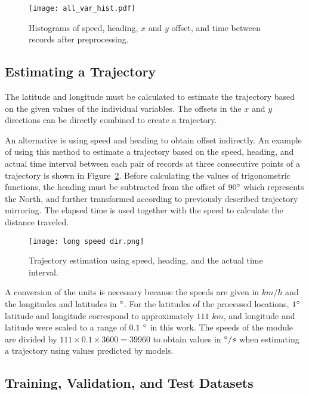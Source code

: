 \documentclass[preprint,12pt]{elsarticle}
\begin{document}
\begin{figure}[!ht]
    \centering
    \texttt{[image: all\_var\_hist.pdf]}
    \caption{Histograms of speed, heading, $x$ and $y$ offset, and time between records after preprocessing.}
    \label{fig:all_var_hist}
\end{figure}

\subsection{Estimating a Trajectory}

The latitude and longitude must be calculated to estimate the trajectory based on the given values of the individual variables. The offsets in the $x$ and $y$ directions can be directly combined to create a trajectory.

An alternative is using speed and heading to obtain offset indirectly. An example of using this method to estimate a trajectory based on the speed, heading, and actual time interval between each pair of records at three consecutive points of a trajectory is shown in Figure~\ref{fig:long speed dir}. Before calculating the values of trigonometric functions, the heading must be subtracted from the offset of $90\degree$ which represents the North, and further transformed according to previously described trajectory mirroring. The elapsed time is used together with the speed to calculate the distance traveled.

\begin{figure}[!ht]
    \centering
    \texttt{[image: long speed dir.png]}
    \caption{Trajectory estimation using speed, heading, and the actual time interval.}
    \label{fig:long speed dir}
\end{figure}
 
A conversion of the units is necessary because the speeds are given in $km/h$ and the longitudes and latitudes in $\degree$. For the latitudes of the processed locations, $1\degree$ latitude and longitude correspond to approximately $111$ $km$, and longitude and latitude were scaled to a range of $0.1$ $\degree$ in this work. The speeds of the module are divided by $111 \times 0.1 \times 3600 = 39960$ to obtain values in $\degree / s$ when estimating a trajectory using values predicted by models.

\subsection{Training, Validation, and Test Datasets}
\end{document}

